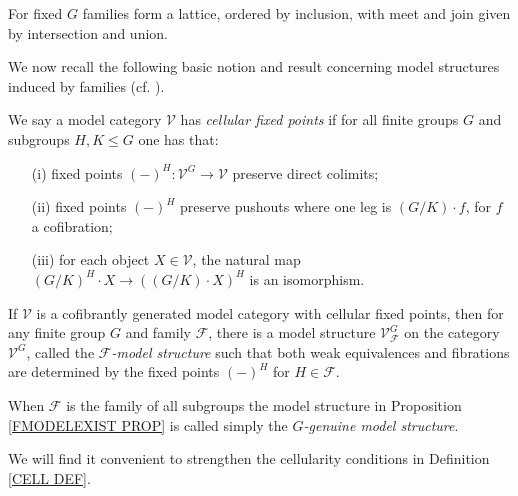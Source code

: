 \documentclass[a4paper,10pt]{article}%
\begin{document}
\begin{remark}
For fixed $G$ families form a lattice, ordered by inclusion, 
with meet and join given by intersection and union.
\end{remark}


We now recall the following basic notion and result concerning model structures induced by families (cf. \cite[Prop. 2.6]{Ste16}).


\begin{definition}\label{CELL DEF}
	We say a model category $\mathcal{V}$ has 
	\textit{cellular fixed points} if for all finite groups $G$ and subgroups $H,K\leq G$ one has that:
\begin{itemize}
	\item[(i)] fixed points $(\minus)^H \colon \mathcal{V}^G \to \mathcal{V}$ preserve direct colimits;
	\item[(ii)] fixed points $(\minus)^H$ preserve pushouts where one leg is $(G/K)\cdot f$, for $f$ a cofibration;
	\item[(iii)] for each object $X \in \mathcal{V}$, the natural map 
	$(G/K)^H \cdot X \to ((G/K) \cdot X)^H$
	is an isomorphism.
\end{itemize}
\end{definition}


\begin{proposition}\label{FMODELEXIST PROP}
	If $\mathcal{V}$ is a cofibrantly generated model category with cellular fixed points, then for any finite group $G$ and family $\mathcal{F}$, there is a model structure $\mathcal{V}^G_{\mathcal{F}}$ on the category 
	$\mathcal{V}^G$, called the 
	\emph{$\mathcal{F}$-model structure}
	such that both weak equivalences and fibrations are determined by the fixed points $(\minus)^H$ for 
	$H \in \mathcal{F}$.
\end{proposition}

When $\mathcal{F}$ is the family of all subgroups the model structure in Proposition \ref{FMODELEXIST PROP} is called simply the \textit{$G$-genuine model structure}.

We will find it convenient to strengthen the cellularity conditions in Definition \ref{CELL DEF}.
\end{document}

